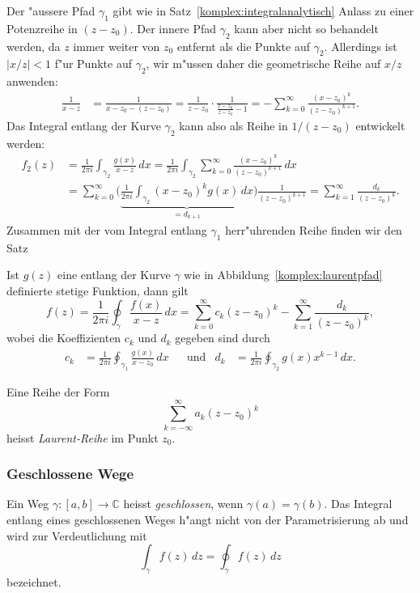 Der "aussere Pfad $\gamma_1$ gibt wie in Satz~\ref{komplex:integralanalytisch}
Anlass zu einer Potenzreihe in $(z-z_0)$.
Der innere Pfad $\gamma_2$ kann aber nicht so behandelt werden, da $z$ immer
weiter von $z_0$ entfernt als die Punkte auf $\gamma_2$.
Allerdings ist $|x/z| < 1$ f"ur Punkte auf $\gamma_2$, wir m"ussen daher
die geometrische Reihe auf $x/z$ anwenden:
\begin{align*}
\frac{1}{x-z}
&=
\frac{1}{x-z_0-(z-z_0)}
=
\frac{1}{z-z_0}
\cdot
\frac{1}{\displaystyle\frac{x-z_0}{z-z_0}-1}
=
-\sum_{k=0}^\infty \frac{(x-z_0)^k}{(z-z_0)^{k+1}}.
\end{align*}
Das Integral entlang der Kurve $\gamma_2$ kann also als Reihe in $1/(z-z_0)$
entwickelt werden:
\begin{align*}
f_2(z)
&=
\frac{1}{2\pi i}\int_{\gamma_2} \frac{g(x)}{x-z}\,dx
=
\frac{1}{2\pi i}\int_{\gamma_2}\sum_{k=0}^\infty
\frac{(x-z_0)^k}{(z-z_0)^{k+1}}\,dx
\\
&=
\sum_{k=0}^\infty
\biggl(
\underbrace{\frac1{2\pi i}\int_{\gamma_2} (x-z_0)^kg(x)\,dx
}_{\displaystyle =d_{k+1}}
\biggr)
\frac1{(z-z_0)^{k+1}}
=\sum_{k=1}^\infty \frac{d_k}{(z-z_0)^k}.
\end{align*}
Zusammen mit der vom Integral entlang $\gamma_1$ herr"uhrenden Reihe finden
wir den Satz
\begin{satz}
\label{komplex:laurentreihe}
Ist $g(z)$ eine entlang der Kurve $\gamma$ wie in
Abbildung~\ref{komplex:laurentpfad} definierte stetige Funktion, dann gilt
\[
f(z)=\frac1{2\pi i}\oint_{\gamma} \frac{f(x)}{x-z}\,dx
=
\sum_{k=0}^{\infty} c_k(z-z_0)^k-\sum_{k=1}^\infty \frac{d_k}{(z-z_0)^k},
\]
wobei die Koeffizienten $c_k$ und $d_k$ gegeben sind durch
\[
\begin{aligned}
c_k&=\frac1{2\pi i}\oint_{\gamma_1} \frac{g(x)}{x-z_0}\,dx
&&
\text{und}
&
d_k&=\frac1{2\pi i}\oint_{\gamma_2} g(x)x^{k-1}\,dx.
\end{aligned}
\]
\end{satz}

\begin{definition}
Eine Reihe der Form
\[
\sum_{k=-\infty}^\infty a_k(z-z_0)^k
\]
heisst {\em Laurent-Reihe }
im Punkt $z_0$.
\end{definition}


%
%
\subsubsection{Geschlossene Wege}
\begin{definition}
Ein Weg $\gamma\colon[a,b]\to\mathbb C$ heisst {\em geschlossen}, wenn
$\gamma(a)=\gamma(b)$.
Das Integral entlang eines geschlossenen Weges h"angt nicht von der
Parametrisierung ab und wird zur Verdeutlichung mit
\[
\int_{\gamma}f(z)\,dz
=
\oint_{\gamma}f(z)\,dz
\]
bezeichnet.
\end{definition}

